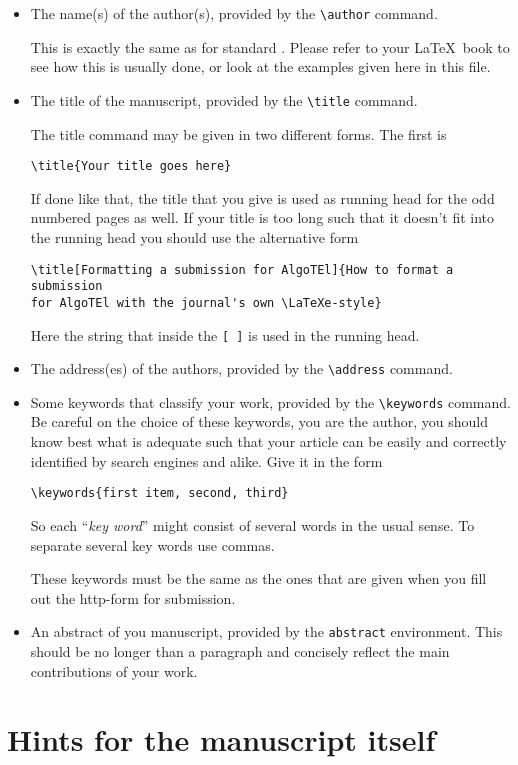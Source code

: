 \documentclass[%
]{algotel}
\begin{document}
\begin{itemize}
\item The name(s) of the author(s), provided by the \verb!\author!
  command.

  This is exactly the same as for standard \LaTeXe. Please refer to
  your \LaTeX\ book to see how this is usually done, or look at the
  examples given here in this file.
\item The title of the manuscript, provided by the \verb!\title!
  command.

  The title command may be given in two different forms. The first is 
\begin{verbatim}
\title{Your title goes here}
\end{verbatim}
  If done like that, the title that you give is used as running head
  for the odd numbered pages as well. If your title is too long such
  that it doesn't fit into the running head you should use the
  alternative form
\begin{verbatim}
\title[Formatting a submission for AlgoTEl]{How to format a submission 
for AlgoTEl with the journal's own \LaTeXe-style}
\end{verbatim}
  Here the string that inside the \verb![ ]! is used in the
  running head.
\item The address(es) of the authors, provided by the \verb!\address!
  command.
\item Some keywords that classify your work, provided by the \verb!\keywords!
  command. Be careful on the choice of these keywords, you are the
  author, you should know best what is adequate such that your
  article can be easily and correctly identified by search engines and 
  alike. Give it in the form
\begin{verbatim}
\keywords{first item, second, third}
\end{verbatim}
  So each ``\emph{key word}'' might consist of several words in the
  usual sense. To separate several key words use commas.

  These keywords must be the same as the ones that are given when you
  fill out the http-form for submission.
\item An abstract of you manuscript, provided by the \verb!abstract!
  environment. This should be no longer than a paragraph and concisely 
  reflect the main contributions of your work. 
  
  
\end{itemize}


\section{Hints for the manuscript itself}
\label{sec:hints}
\end{document}

